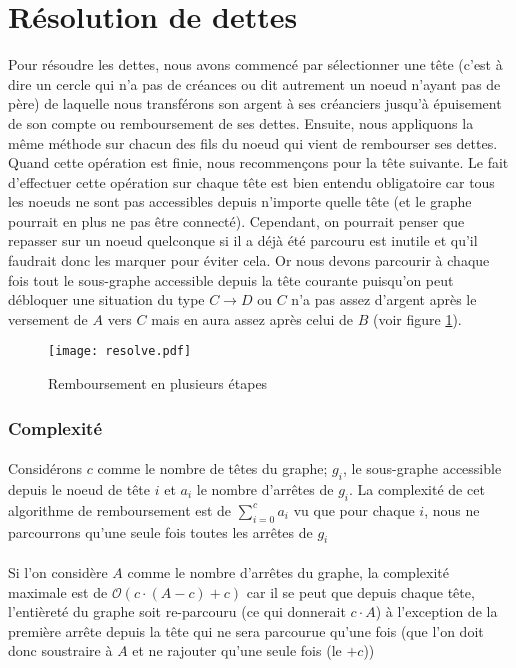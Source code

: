 \documentclass[12pt, oneside]{article}
\begin{document}
\section{Résolution de dettes}
Pour résoudre les dettes, nous avons commencé par sélectionner une tête (c'est à dire un cercle qui n'a pas de créances ou dit autrement un noeud n'ayant pas de père) de laquelle nous transférons son argent à ses créanciers jusqu'à épuisement de son compte ou remboursement de ses dettes.
Ensuite, nous appliquons la même méthode sur chacun des fils du noeud qui vient de rembourser ses dettes.
Quand cette opération est finie, nous recommençons pour la tête suivante.
Le fait d'effectuer cette opération sur chaque tête est bien entendu obligatoire car tous les noeuds ne sont pas accessibles depuis n'importe quelle tête (et le graphe pourrait en plus ne pas être connecté). Cependant, on pourrait penser que repasser sur un noeud quelconque si il a déjà été parcouru est inutile et qu'il faudrait donc les marquer pour éviter cela. Or nous devons parcourir à chaque fois tout le sous-graphe accessible depuis la tête courante puisqu'on peut débloquer une situation du type $C \rightarrow D$ ou $C$ n'a pas assez d'argent après le versement de $A$ vers $C$ mais en aura assez après celui de $B$ (voir figure \ref{resolve}).
\begin{figure}[h]
\caption{\label{resolve} Remboursement en plusieurs étapes}
\center
\texttt{[image: resolve.pdf]}
\end{figure}
\subsubsection{Complexité}
\paragraph{}
Considérons $c$ comme le nombre de têtes du graphe; $g_{i}$, le sous-graphe accessible depuis le noeud de tête $i$ et $a_{i}$ le nombre d'arrêtes de $g_{i}$.
La complexité de cet algorithme de remboursement est de $\sum_{i=0}^{c}a_{i}$ vu que pour chaque $i$, nous ne parcourrons qu'une seule fois toutes les arrêtes de $g_{i}$
\paragraph{}
Si l'on considère $A$ comme le nombre d'arrêtes du graphe, la complexité maximale est de $ \mathcal{O}(c\cdot(A-c)+c)$ car il se peut que depuis chaque tête, l'entièreté du graphe soit re-parcouru (ce qui donnerait $c\cdot A$) à l'exception de la première arrête depuis la tête qui ne sera parcourue qu'une fois (que l'on doit donc soustraire à $A$ et ne rajouter qu'une seule fois (le $+c$))
\end{document}
